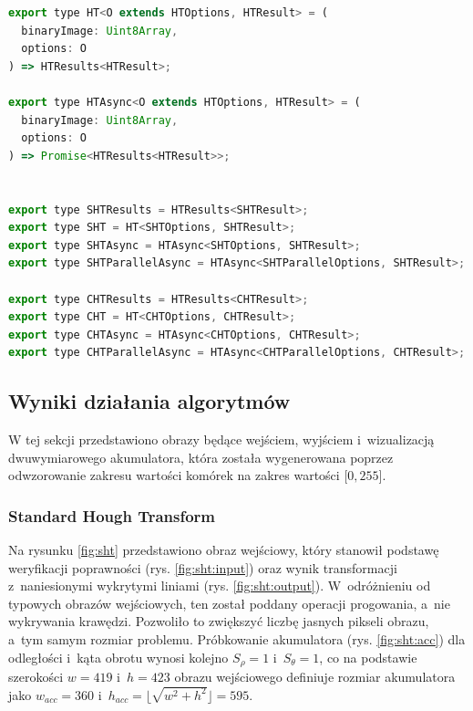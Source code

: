 \begin{lstlisting}[language=JavaScript, float=ht, caption=Definicja typów funkcji wariantu SHT i~CHT,label=lst:meta]
export type HT<O extends HTOptions, HTResult> = (
  binaryImage: Uint8Array,
  options: O
) => HTResults<HTResult>;

export type HTAsync<O extends HTOptions, HTResult> = (
  binaryImage: Uint8Array,
  options: O
) => Promise<HTResults<HTResult>>;


export type SHTResults = HTResults<SHTResult>;
export type SHT = HT<SHTOptions, SHTResult>;
export type SHTAsync = HTAsync<SHTOptions, SHTResult>;
export type SHTParallelAsync = HTAsync<SHTParallelOptions, SHTResult>;

export type CHTResults = HTResults<CHTResult>;
export type CHT = HT<CHTOptions, CHTResult>;
export type CHTAsync = HTAsync<CHTOptions, CHTResult>;
export type CHTParallelAsync = HTAsync<CHTParallelOptions, CHTResult>;
\end{lstlisting}

\subsection{Wyniki działania algorytmów}

W tej sekcji przedstawiono obrazy będące wejściem, wyjściem i~wizualizacją dwuwymiarowego akumulatora, która została wygenerowana poprzez odwzorowanie zakresu wartości komórek na zakres wartości $\lbrack 0, 255\rbrack$.

\subsubsection{Standard Hough Transform}

Na rysunku \ref{fig:sht} przedstawiono obraz wejściowy, który stanowił podstawę weryfikacji poprawności (rys. \ref{fig:sht:input}) oraz wynik transformacji z~naniesionymi wykrytymi liniami (rys. \ref{fig:sht:output}). W~odróżnieniu od typowych obrazów wejściowych, ten został poddany operacji progowania, a~nie wykrywania krawędzi. Pozwoliło to zwiększyć liczbę jasnych pikseli obrazu, a~tym samym rozmiar problemu. Próbkowanie akumulatora (rys. \ref{fig:sht:acc}) dla odległości i~kąta obrotu wynosi kolejno $S_\rho = 1$ i~$S_\theta = 1$, co na podstawie szerokości $w = 419$ i~$h = 423$ obrazu wejściowego definiuje rozmiar akumulatora jako $w_{acc} = 360$ i~$h_{acc} = \lfloor\sqrt{w^2+h^2}\rfloor = 595$.

